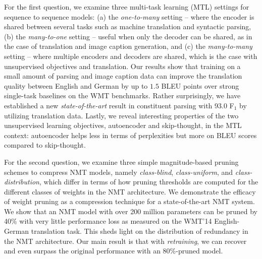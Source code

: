 For the first question, 
we examine three multi-task learning (MTL) settings for sequence to sequence
models:
(a) the {\it one-to-many} setting -- where the encoder is shared
between several tasks such as machine translation and
syntactic parsing, (b) the {\it many-to-one} setting -- useful when only the
decoder can be shared, as in the case of 
translation and image caption generation, and (c) the {\it
  many-to-many} setting -- where multiple encoders and decoders are
shared, which is the case with unsupervised objectives
and translation.  Our results show that training on a small amount of parsing and
image caption data can improve the translation quality between English and
German by up to $1.5$ BLEU
points over strong single-task baselines on the WMT benchmarks. Rather
surprisingly,
we have established a new {\it
state-of-the-art} result in constituent parsing with 93.0 F$_1$ by utilizing
translation data. Lastly, we reveal interesting properties of the two unsupervised learning
objectives, autoencoder and skip-thought, in the MTL context: autoencoder helps less in terms of
perplexities but more on BLEU scores compared to skip-thought.

For the second question, we examine three simple magnitude-based pruning schemes to compress NMT models, namely {\it class-blind}, {\it class-uniform}, and {\it class-distribution}, which differ in terms of how pruning thresholds are computed for the different classes of weights in the NMT architecture.
We demonstrate the efficacy of weight pruning as a compression technique for a state-of-the-art NMT system. 
We show that an NMT model with over 200 million parameters can be pruned by 40\% with very little performance loss as measured on the WMT'14 English-German translation task. 
This sheds light on the distribution of redundancy in the NMT architecture.
Our main result is that with {\it retraining}, we can recover and even surpass the original performance with an 80\%-pruned model. 


